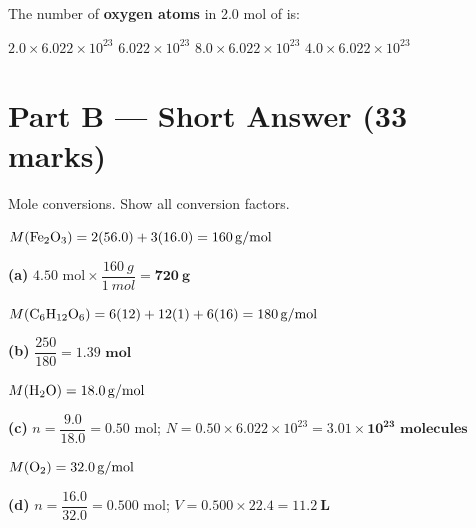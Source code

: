 \documentclass[addpoints]{exam}
\begin{document}
\begin{questions}
\question[1] The number of \textbf{oxygen atoms} in 2.0 mol of  is:
\begin{choices}
    \choice $2.0 \times 6.022 \times 10^{23}$
    \choice $6.022 \times 10^{23}$
    \correctchoice $8.0 \times 6.022 \times 10^{23}$
    \choice $4.0 \times 6.022 \times 10^{23}$
\end{choices}


\section*{Part B --- Short Answer (33 marks)}

\question Mole conversions. Show all conversion factors.
\begin{solution}[9cm]
$M(\ce{Fe2O3}) = 2(56.0) + 3(16.0) = \SI{160}{g/mol}$

\textbf{(a)} $4.50 \text{ mol} \times \dfrac{\SI{160}{g}}{\SI{1}{mol}} = \mathbf{\SI{720}{g}}$

$M(\ce{C6H12O6}) = 6(12)+12(1)+6(16) = \SI{180}{g/mol}$

\textbf{(b)} $\dfrac{250}{180} = \mathbf{1.39 \text{ mol}}$

$M(\ce{H2O}) = \SI{18.0}{g/mol}$

\textbf{(c)} $n = \dfrac{9.0}{18.0} = 0.50 \text{ mol}$;\quad
$N = 0.50 \times 6.022\times10^{23} = \mathbf{3.01 \times 10^{23} \text{ molecules}}$

$M(\ce{O2}) = \SI{32.0}{g/mol}$

\textbf{(d)} $n = \dfrac{16.0}{32.0} = 0.500 \text{ mol}$;\quad
$V = 0.500 \times 22.4 = \mathbf{\SI{11.2}{L}}$
\end{solution}


\end{questions}
\end{document}
